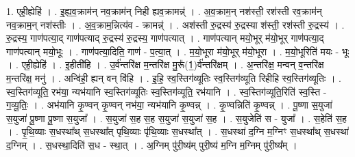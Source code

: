 \documentclass[17pt]{extarticle}
\begin{document}
1. एही॒ह्येहि॑ । . इ॒ह्य॒व॒क्राम॑न् नव॒क्राम॑न् निही ह्यव॒क्रामन्न्॑ । . अ॒व॒क्राम॒न् नश॑स्ती॒ रश॑स्ती रव॒क्राम॑न् नव॒क्राम॒न् नश॑स्तीः । . अ॒व॒क्राम॒न्नित्य॑व - क्रामन्न्॑ । . अश॑स्ती रु॒द्रस्य॑ रु॒द्रस्या श॑स्ती॒ रश॑स्ती रु॒द्रस्य॑ । . रु॒द्रस्य॒ गाण॑पत्या॒द् गाण॑पत्याद् रु॒द्रस्य॑ रु॒द्रस्य॒ गाण॑पत्यात् । . गाण॑पत्यान् मयो॒भूर् म॑यो॒भूर् गाण॑पत्या॒द् गाण॑पत्यान् मयो॒भूः । . गाण॑पत्या॒दिति॒ गाण॑ - प॒त्या॒त् । . म॒यो॒भूरा म॑यो॒भूर् म॑यो॒भूरा । . म॒यो॒भूरिति॑ मयः - भूः । . एही॒ह्येहि॑ । . इ॒हीती॑हि । . उ॒र्व॑न्तरि॑क्ष म॒न्तरि॑क्ष मु॒रू᳚(1॒)र्व॑न्तरि॑क्षम् । . अ॒न्तरि॑क्ष॒ मन्वन् व॒न्तरि॑क्ष म॒न्तरि॑क्ष॒ मनु॑ । . अन्वि॑ही॒ ह्यन् वन् वि॑हि । . इ॒हि॒ स्व॒स्तिग॑व्यूतिः स्व॒स्तिग॑व्यूति रिहीहि स्व॒स्तिग॑व्यूतिः । . स्व॒स्तिग॑व्यूति॒ रभ॑या॒ न्यभ॑यानि स्व॒स्तिग॑व्यूतिः स्व॒स्तिग॑व्यूति॒ रभ॑यानि । . स्व॒स्तिग॑व्यूति॒रिति॑ स्व॒स्ति - ग॒व्यू॒तिः॒ । . अभ॑यानि कृ॒ण्वन् कृ॒ण्वन् नभ॑या॒ न्यभ॑यानि कृ॒ण्वन्न् । . कृ॒ण्वन्निति॑ कृ॒ण्वन्न् । . पू॒ष्णा स॒युजा॑ स॒युजा॑ पू॒ष्णा पू॒ष्णा स॒युजा᳚ । . स॒युजा॑ स॒ह स॒ह स॒युजा॑ स॒युजा॑ स॒ह । . स॒युजेति॑ स - युजा᳚ । . स॒हेति॑ स॒ह । . पृ॒थि॒व्याः स॒धस्था᳚थ् स॒धस्था᳚त् पृथि॒व्याः पृ॑थि॒व्याः स॒धस्था᳚त् । . स॒धस्था॑ द॒ग्नि म॒ग्निꣳ स॒धस्था᳚थ् स॒धस्था॑ द॒ग्निम् । . स॒धस्था॒दिति॑ स॒ध - स्था॒त् । . अ॒ग्निम् पु॑री॒ष्य॑म् पुरी॒ष्य॑ म॒ग्नि म॒ग्निम् पु॑री॒ष्य᳚म् । \newline
\end{document}
